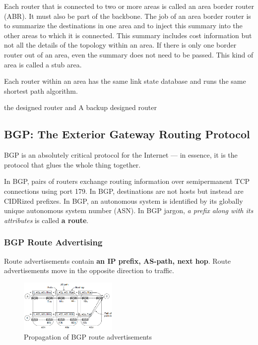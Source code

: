 Each router that is connected to two or more areas is called an area border router (ABR). It must also be part of the backbone. The job of an area border router is to summarize the destinations in one area and to inject this summary into the other areas to which it is connected. This summary includes cost information but not all the details of the topology within an area. If there is only one border router out of an area, even the summary does not need to be passed. This kind of area is called a stub area.

Each router within an area has the same link state database and runs the same shortest path algorithm.

the designed router and A backup designed router

\subsection{BGP: The Exterior Gateway Routing Protocol}
BGP is an absolutely critical protocol for the Internet --- in essence, it is the protocol that glues the whole thing together.

In BGP, pairs of routers exchange routing information over semipermanent TCP connections using port 179. In BGP, destinations are not hosts but instead are CIDRized prefixes. In BGP, an autonomous system is identified by its globally unique autonomous system number (ASN). In BGP jargon, \textit{a prefix along with its attributes} is called \textbf{a route}. %

\subsubsection{BGP Route Advertising}
Route advertisements contain \textbf{an IP prefix, AS-path, next hop}. Route advertisements move in the opposite direction to traffic.

\begin{figure}[!htb]
    \centering
    \includegraphics[width=0.42\textwidth]{pic/CN5/Propagation of BGP route advertisements}
    \caption{Propagation of BGP route advertisements}
\end{figure}

